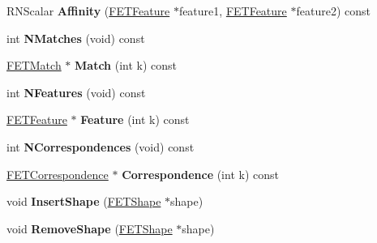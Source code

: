 \begin{DoxyCompactItemize}
\item 
R\+N\+Scalar {\bfseries Affinity} (\hyperlink{struct_f_e_t_feature}{F\+E\+T\+Feature} $\ast$feature1, \hyperlink{struct_f_e_t_feature}{F\+E\+T\+Feature} $\ast$feature2) const \hypertarget{struct_f_e_t_reconstruction_af990d18d63ef7a5dea12fedd3c3bd121}{}\label{struct_f_e_t_reconstruction_af990d18d63ef7a5dea12fedd3c3bd121}

\item 
int {\bfseries N\+Matches} (void) const \hypertarget{struct_f_e_t_reconstruction_a74e96483443b737e3a0fc208e7d32db9}{}\label{struct_f_e_t_reconstruction_a74e96483443b737e3a0fc208e7d32db9}

\item 
\hyperlink{struct_f_e_t_match}{F\+E\+T\+Match} $\ast$ {\bfseries Match} (int k) const \hypertarget{struct_f_e_t_reconstruction_ae029fb43ab75f97ef96467d9c5d212de}{}\label{struct_f_e_t_reconstruction_ae029fb43ab75f97ef96467d9c5d212de}

\item 
int {\bfseries N\+Features} (void) const \hypertarget{struct_f_e_t_reconstruction_a4d8133dd3c9f418dee7bd9db1181a6cb}{}\label{struct_f_e_t_reconstruction_a4d8133dd3c9f418dee7bd9db1181a6cb}

\item 
\hyperlink{struct_f_e_t_feature}{F\+E\+T\+Feature} $\ast$ {\bfseries Feature} (int k) const \hypertarget{struct_f_e_t_reconstruction_a0a9ae0824b986b145ced37bcd52afd47}{}\label{struct_f_e_t_reconstruction_a0a9ae0824b986b145ced37bcd52afd47}

\item 
int {\bfseries N\+Correspondences} (void) const \hypertarget{struct_f_e_t_reconstruction_a69e765f40440302b52745e6c6cae50e8}{}\label{struct_f_e_t_reconstruction_a69e765f40440302b52745e6c6cae50e8}

\item 
\hyperlink{struct_f_e_t_correspondence}{F\+E\+T\+Correspondence} $\ast$ {\bfseries Correspondence} (int k) const \hypertarget{struct_f_e_t_reconstruction_ad5d7aac028516f2bf9a5091e8f61c342}{}\label{struct_f_e_t_reconstruction_ad5d7aac028516f2bf9a5091e8f61c342}

\item 
void {\bfseries Insert\+Shape} (\hyperlink{struct_f_e_t_shape}{F\+E\+T\+Shape} $\ast$shape)\hypertarget{struct_f_e_t_reconstruction_a6a2b396b70e354445b2dae7bdcf5f0a6}{}\label{struct_f_e_t_reconstruction_a6a2b396b70e354445b2dae7bdcf5f0a6}

\item 
void {\bfseries Remove\+Shape} (\hyperlink{struct_f_e_t_shape}{F\+E\+T\+Shape} $\ast$shape)\hypertarget{struct_f_e_t_reconstruction_abe391612ef2b22c3948f560c3ae47a23}{}\label{struct_f_e_t_reconstruction_abe391612ef2b22c3948f560c3ae47a23}


\end{DoxyCompactItemize}

